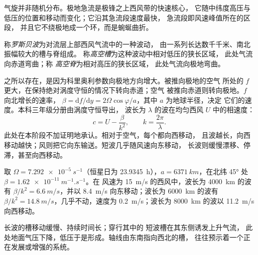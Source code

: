 气旋并非随机分布。极地急流是极锋之上西风带的快速核心，
它随中纬度高压与低压的位置和移动而变化；它沿其急流段速度最快，
急流段即风速峰值所在的区段，
并且它不绕极地成一个环，而是蜿蜒曲折。

\begin{definition}\label{def:b2:weather-systems:rossby}
称\emph{罗斯贝波}为对流层上部西风气流中的一种波动，
由一系列长达数千千米、南北振幅较大的槽与脊组成。
称\emph{高空槽}为这种波动中相对低压的狭长区域，
此处气流向赤道弯曲；称
\emph{高空脊}为相对高压的狭长区域，
此处气流向极地弯曲。
\end{definition}

之所以存在，是因为科里奥利参数向极地方向增大。被推向极地的空气
所处的 $f$ 更大，在保持绝对涡度守恒的情况下转向赤道；空气
被推向赤道则转向极地。$f$ 向北增长的速率，
$\beta = \mathrm{d}f/\mathrm{d}y = 2\Omega\cos\varphi/a$，其中 $a$ 为地球半径，决定
它们的速度。本科三年级分册由涡度守恒导出，
波长为 $\lambda$ 的波在均匀西风 $U$ 中的相速度：
\[
  c = U - \frac{\beta}{k^2}, \qquad k = \frac{2\pi}{\lambda} .
\]
此处在本阶段不加证明地承认。相对于空气，每个都向西移动，
且波越长，向西移动越快；风则把它向东输送。短波几乎随风速向东移动，
长波则缓慢漂移、停滞，甚至向西移动。

\begin{example}[北纬 45° 处的三个波]\label{ex:b2:weather-systems:rossby}
取 $\Omega = \qty{7.292e-5}{s^{-1}}$（恒星日为 \qty{23.9345}{h}），$a =
\qty{6371}{km}$，在北纬 \ang{45} 处 $\beta = \qty{1.62e-11}{m^{-1}.s^{-1}}$。在
风速为 \qty{15}{m/s} 的西风中，波长为 \qty{4000}{km} 的波有 $\beta/k^2 = \qty{6.6}{m/s}$，并以
\qty{8.4}{m/s} 向东移动；波长为 \qty{6000}{km} 的波有 $\beta/k^2 = \qty{14.8}{m/s}$，几乎不动，速度为
\qty{0.2}{m/s}；波长为 \qty{8000}{km} 的波以 \qty{11.2}{m/s} 向西移动。
\end{example}

长波的槽移动缓慢、持续时间长；穿行其中的
短波槽在其东侧诱发上升气流，
此处地面气压下降，低压于是形成。轴线由东南指向西北的槽，
往往预示着一个正在发展或增强的系统。

